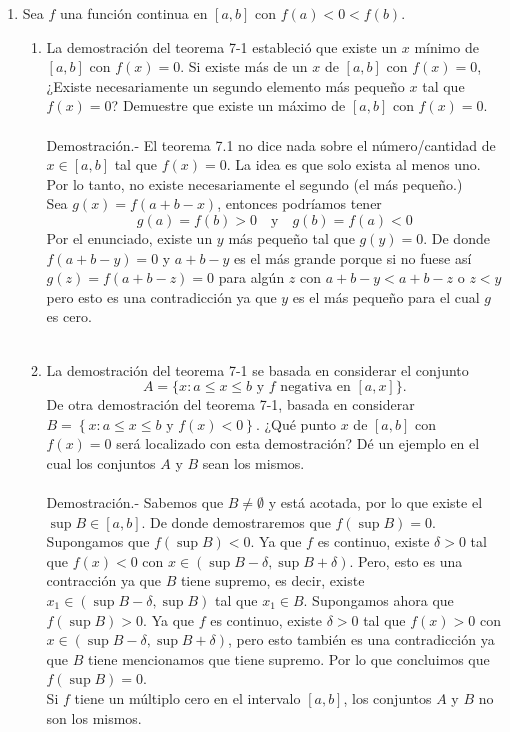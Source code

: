 \begin{enumerate}[\bfseries 1.]
\begin{enumerate}[\bfseries (a)]
	\end{enumerate}

    \item Sea $f$ una función continua en $[a,b]$ con $f(a)<0<f(b)$.

	\begin{enumerate}[\bfseries (a)]

	    \item La demostración del teorema 7-1 estableció que existe un $x$ mínimo de $[a,b]$ con $f(x)=0$. Si existe más de un $x$ de $[a,b]$ con $f(x)=0$, ¿Existe necesariamente un segundo elemento más pequeño $x$ tal que $f(x)=0$? Demuestre que existe un máximo de $[a,b]$ con $f(x)=0$.\\\\
		Demostración.-\; El teorema 7.1 no dice nada sobre el número/cantidad  de $x\in[a,b]$ tal que $f(x)=0$. La idea es que solo exista al menos uno. Por lo tanto, no existe necesariamente el segundo (el más pequeño.)\\
		Sea $g(x)=f(a+b-x)$, entonces podríamos tener 
		$$g(a)=f(b)>0\quad \mbox{y}\quad g(b)=f(a)<0$$ 
		Por el enunciado, existe un $y$ más pequeño tal que $g(y)=0$. De donde $f(a+b-y)=0$ y $a+b-y$ es el más grande porque si no fuese así $g(z)=f(a+b-z)=0$ para algún $z$ con $a+b-y<a+b-z$ o $z<y$ pero esto es una contradicción ya que $y$ es el más pequeño para el cual $g$ es cero.\\\\

	    \item La demostración del teorema 7-1 se basada en considerar el conjunto $$A=\lbrace x:a\leq x \leq b \mbox{ y } f \mbox{ negativa en }[a,x]\rbrace.$$ De otra demostración del teorema 7-1, basada en considerar $B=\left\{x:a\leq x\leq b \mbox{ y } f(x)<0\right\}.$ ¿Qué punto $x$ de $[a,b]$ con $f(x)=0$ será localizado con esta demostración? Dé un ejemplo en el cual los conjuntos $A$ y $B$ sean los mismos.\\\\
		Demostración.-\; Sabemos que $B\neq \emptyset$ y está acotada, por lo que existe el $\sup B \in [a,b]$. De donde demostraremos que $f(\sup B)=0$.\\
		Supongamos que $f(\sup B)<0$. Ya que $f$ es continuo, existe $\delta>0$ tal que $f(x)<0$ con $x\in (\sup B - \delta, \sup B +\delta)$. Pero, esto es una contracción ya que $B$ tiene supremo, es decir, existe $x_1\in (\sup B-\delta, \sup B)$ tal que $x_1\in B$. Supongamos ahora que $f(\sup B)>0$. Ya que $f$ es continuo, existe $\delta>0$ tal que $f(x)>0$ con $x\in (\sup B - \delta, \sup B + \delta)$, pero esto también es una contradicción ya que $B$ tiene mencionamos que tiene supremo. Por lo que concluimos que $f(\sup B)=0$.\\
		Si $f$ tiene un múltiplo cero en el intervalo $[a,b]$, los conjuntos $A$ y $B$ no son los mismos.


\end{enumerate}
\end{enumerate}
